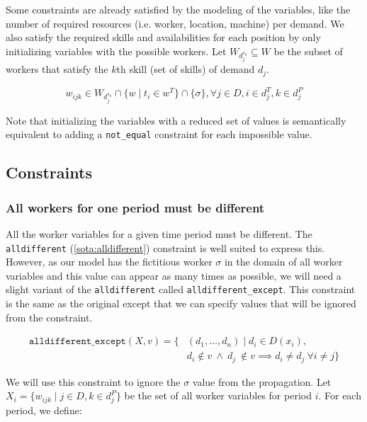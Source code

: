 \documentclass[../../thesis.tex]{subfiles}
\begin{document}
Some constraints are already satisfied by the modeling of the variables, like the number of required resources (i.e. worker, location, machine)
per demand. We also satisfy the required skills and availabilities for each position by only initializing variables with the 
possible workers. Let $W_{d^{s_k}_j} \subseteq W$ be the subset of workers that satisfy the $k$th skill (set of skills) of demand $d_j$.

\begin{equation}
  w_{ijk} \in W_{d^{s_k}_j} \cap \{ w \mid t_i \in w^T \} \cap \{ \sigma \}, \forall j \in D, i \in d^T_j, k \in d^P_j
\end{equation}

Note that initializing the variables with a reduced set of values is semantically equivalent to adding a \texttt{not\_equal} constraint for each impossible value.

\subsection{Constraints}

\subsubsection{All workers for one period must be different}

All the worker variables for a given time period must be different. 
The \texttt{alldifferent} (\autoref{sota:alldifferent}) constraint is well suited to express this. 
However, as our model has the fictitious worker $\sigma$ in the domain of all worker variables and this value 
can appear as many times as possible, we will need a slight variant of the \texttt{alldifferent} called \texttt{alldifferent\_except}. 
This constraint is the same as the original except that we can specify values that will be ignored from 
the constraint.

\begin{align*}
   \texttt{alldifferent\_except} (X, v) = \{& (d_1, \dots, d_n) \mid d_i \in D(x_i), \\ 
   & d_i \notin v \ \land \ d_j \ \notin v \implies d_i \neq d_j \ \forall i \neq j \}
\end{align*}

We will use this constraint to ignore the $\sigma$ value from the propagation. Let $X_i = \{w_{ijk} \mid j \in D, k \in d_j^P \}$ be the set of all worker variables for period $i$. For each period, we define:
\end{document}
